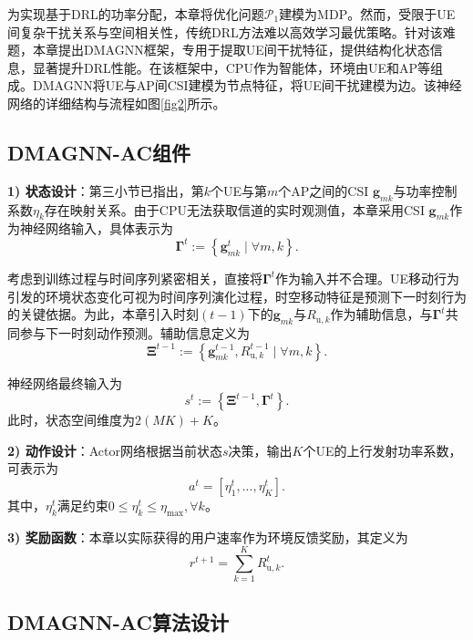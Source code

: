为实现基于DRL的功率分配，本章将优化问题$\mathcal{P}_1$建模为MDP。然而，受限于UE间复杂干扰关系与空间相关性，传统DRL方法难以高效学习最优策略。针对该难题，本章提出DMAGNN框架，专用于提取UE间干扰特征，提供结构化状态信息，显著提升DRL性能。在该框架中，CPU作为智能体，环境由UE和AP等组成。DMAGNN将UE与AP间CSI建模为节点特征，将UE间干扰建模为边。该神经网络的详细结构与流程如图\ref{fig2}所示。

\subsection{DMAGNN-AC组件}

\textbf{1) 状态设计}：第三小节已指出，第$k$个UE与第$m$个AP之间的CSI $\mathbf{g}_{mk}$与功率控制系数$\eta_k$存在映射关系。由于CPU无法获取信道的实时观测值，本章采用CSI $\mathbf{g}_{mk}$作为神经网络输入，具体表示为
\begin{equation} \boldsymbol{\Gamma}^t := \left \{ \mathbf{g}_{mk}^t \mid \forall m,k \right \}. \end{equation}

考虑到训练过程与时间序列紧密相关，直接将$\boldsymbol{\Gamma}^t$作为输入并不合理。UE移动行为引发的环境状态变化可视为时间序列演化过程，时空移动特征是预测下一时刻行为的关键依据。为此，本章引入时刻$(t-1)$下的$\mathbf{g}_{mk}$与$R_{\text{u},k}$作为辅助信息，与$\boldsymbol{\Gamma}^t$共同参与下一时刻动作预测。辅助信息定义为
\begin{equation} \boldsymbol{\Xi}^{t-1} := \left \{ \mathbf{g}_{mk}^{t-1}, R_{\text{u},k}^{t-1} \mid \forall m,k \right \}. \end{equation}

神经网络最终输入为
\begin{equation} s^t := \left \{ \boldsymbol{\Xi}^{t-1}, \boldsymbol{\Gamma}^t \right \}. \end{equation}
此时，状态空间维度为$2(MK)+K$。

\textbf{2) 动作设计}：Actor网络根据当前状态$s$决策，输出$K$个UE的上行发射功率系数，可表示为
\begin{equation} a^t = [\eta_1^t, ..., \eta_K^t]. \end{equation}
其中，$\eta_k^t$满足约束$0 \leq \eta_k^t \leq \eta_{\text{max}}, \forall k$。

\textbf{3) 奖励函数}：本章以实际获得的用户速率作为环境反馈奖励，其定义为
\begin{equation} r^{t+1} = \sum_{k=1}^{K} R_{\text{u},k}^t. \end{equation}

\subsection{DMAGNN-AC算法设计}

